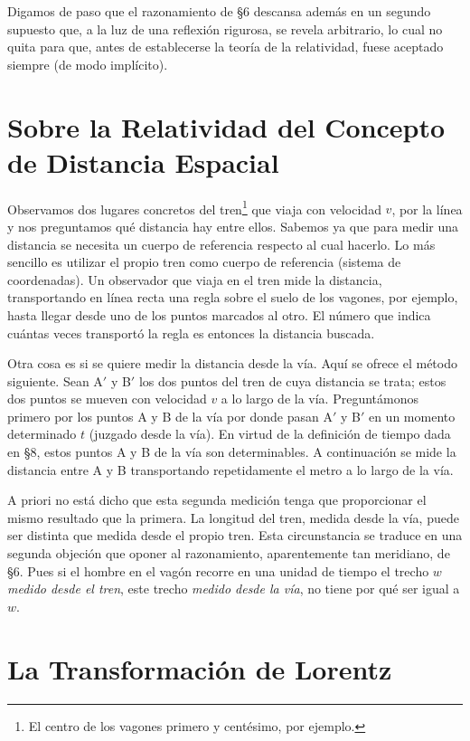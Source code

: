 \documentclass[spanish]{book}
\begin{document}
Digamos de paso que el razonamiento de \S 6 descansa además en un segundo supuesto que, a la luz de
una reflexión rigurosa, se revela arbitrario, lo cual no quita para que, antes de
establecerse la teoría de la relatividad, fuese aceptado siempre (de modo implícito).

\chapter{Sobre la Relatividad del Concepto de Distancia Espacial}

Observamos dos lugares concretos del tren\footnote{El centro de los vagones 
primero y centésimo, por ejemplo.} que viaja con velocidad $v$, por la
línea y nos preguntamos qué distancia hay entre ellos. Sabemos ya que para medir
una distancia se necesita un cuerpo de referencia respecto al cual hacerlo. Lo más
sencillo es utilizar el propio tren como cuerpo de referencia (sistema de coordenadas).
Un observador que viaja en el tren mide la distancia, transportando en línea recta una
regla sobre el suelo de los vagones, por ejemplo, hasta llegar desde uno de los puntos
marcados al otro. El número que indica cuántas veces transportó la regla es entonces la
distancia buscada.

Otra cosa es si se quiere medir la distancia desde la vía. Aquí se ofrece el método
siguiente. Sean A$'$ y B$'$ los dos puntos del tren de cuya distancia se trata; estos
dos puntos se mueven con velocidad $v$ a lo largo de la vía. Preguntámonos primero
por los puntos A y B de la vía por donde pasan A$'$ y B$'$ en un momento determinado $t$
(juzgado desde la vía). En virtud de la definición de tiempo dada en \S 8, estos puntos
A y B de la vía son determinables. A continuación se mide la distancia entre A y B
transportando repetidamente el metro a lo largo de la vía.

A priori no está dicho que esta segunda medición tenga que proporcionar el mismo
resultado que la primera. La longitud del tren, medida desde la vía, puede ser distinta
que medida desde el propio tren. Esta circunstancia se traduce en una segunda
objeción que oponer al razonamiento, aparentemente tan meridiano, de \S 6. Pues si el
hombre en el vagón recorre en una unidad de tiempo el trecho $w$ \textit{medido desde el tren}, 
este trecho \textit{medido desde la vía}, no tiene por qué ser igual a $w$.


\chapter{La Transformación de Lorentz}
\end{document}
